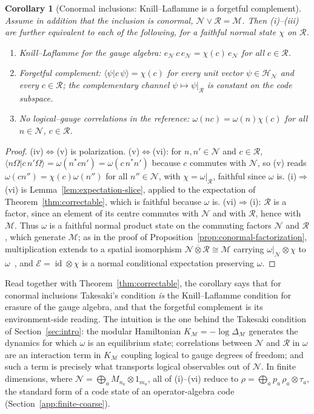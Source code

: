 \documentclass[a4paper,11pt]{article}
\newtheorem{corollary}[theorem]{Corollary}
\theoremstyle{definition}
\newcommand{\mR}{\mathcal{R}}
\newcommand{\mN}{\mathcal{N}}
\newcommand{\mH}{\mathcal{H}}
\newcommand{\mM}{\mathcal{M}}
\newcommand{\mE}{\mathcal{E}}
\begin{document}
\begin{corollary}[Conormal inclusions: Knill--Laflamme is a forgetful complement]\label{cor:KL-conormal}
Assume in addition that the inclusion is conormal, $\mN\vee\mR=\mM$. Then {\rm(i)--(iii)} are further equivalent to each of the following, for a faithful normal state $\chi$ on $\mR$.
\begin{enumerate}
 \item[\rm(iv)] \emph{Knill--Laflamme for the gauge algebra:} $e_{\mN}\,c\,e_{\mN}=\chi(c)\,e_{\mN}$ for all $c\in\mR$.
 \item[\rm(v)] \emph{Forgetful complement:} $\langle\psi|c\,\psi\rangle=\chi(c)$ for every unit vector $\psi\in\mH_{\mN}$ and every $c\in\mR$; the complementary channel $\psi\mapsto\psi|_{\mR}$ is constant on the code subspace.
 \item[\rm(vi)] \emph{No logical--gauge correlations in the reference:} $\omega(nc)=\omega(n)\chi(c)$ for all $n\in\mN$, $c\in\mR$.
\end{enumerate}
\end{corollary}

\begin{proof}
(iv)$\Leftrightarrow$(v) is polarization. (v)$\Leftrightarrow$(vi): for $n,n'\in\mN$ and $c\in\mR$, $\langle n\Omega|c\,n'\Omega\rangle=\omega(n^*cn')=\omega(c\,n^*n')$ because $c$ commutes with $\mN$, so (v) reads $\omega(cn'')=\chi(c)\omega(n'')$ for all $n''\in\mN$, with $\chi=\omega|_{\mR}$, faithful since $\omega$ is. (i)$\Rightarrow$(vi) is Lemma~\ref{lem:expectation-slice}, applied to the expectation of Theorem~\ref{thm:correctable}, which is faithful because $\omega$ is. (vi)$\Rightarrow$(i): $\mR$ is a factor, since an element of its centre commutes with $\mN$ and with $\mR$, hence with $\mM$. Thus $\omega$ is a faithful normal product state on the commuting factors $\mN$ and $\mR$, which generate $\mM$; as in the proof of Proposition~\ref{prop:conormal-factorization}, multiplication extends to a spatial isomorphism $\mN\overline\otimes\mR\cong\mM$ carrying $\omega|_{\mN}\otimes\chi$ to $\omega$~\cite{DoplicherLongo1984}, and $\mE=\operatorname{id}\otimes\chi$ is a normal conditional expectation preserving $\omega$.
\end{proof}

Read together with Theorem~\ref{thm:correctable}, the corollary says that for conormal inclusions Takesaki's condition \emph{is} the Knill--Laflamme condition for erasure of the gauge algebra, and that the forgetful complement is its environment-side reading. The intuition is the one behind the Takesaki condition of Section~\ref{sec:intro}: the modular Hamiltonian $K_{\mM}=-\log\Delta_{\mM}$ generates the dynamics for which $\omega$ is an equilibrium state; correlations between $\mN$ and $\mR$ in $\omega$ are an interaction term in $K_{\mM}$ coupling logical to gauge degrees of freedom; and such a term is precisely what transports logical observables out of $\mN$. In finite dimensions, where $\mN=\bigoplus_aM_{n_a}\otimes1_{m_a}$, all of (i)--(vi) reduce to $\rho=\bigoplus_ap_a\,\rho_a\otimes\tau_a$, the standard form of a code state of an operator-algebra code (Section~\ref{app:finite-coarse}).
\end{document}
